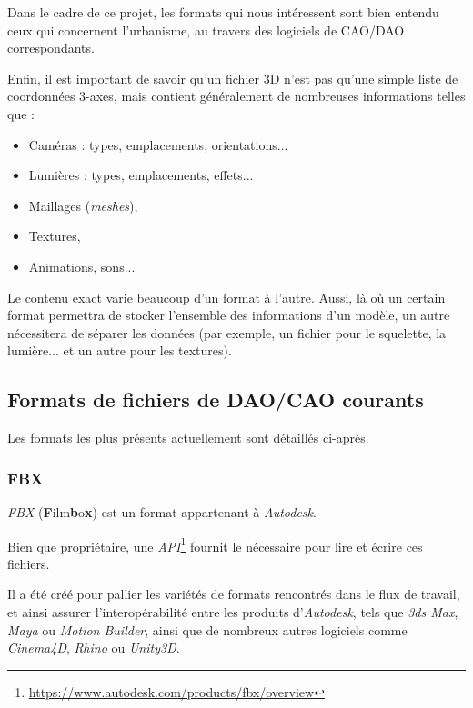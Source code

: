 Dans le cadre de ce projet, les formats qui nous intéressent sont bien entendu ceux qui concernent l'urbanisme, au travers des logiciels de CAO/DAO correspondants.

Enfin, il est important de savoir qu'un fichier 3D n'est pas qu'une simple liste de coordonnées 3-axes, mais contient généralement de nombreuses informations telles que : 
\begin{itemize}
    \item Caméras : types, emplacements, orientations...
    \item Lumières : types, emplacements, effets...
    \item Maillages (\textit{meshes}),
    \item Textures,
    \item Animations, sons...
\end{itemize}

Le contenu exact varie beaucoup d'un format à l'autre. Aussi, là où un certain format permettra de stocker l'ensemble des informations d'un modèle, un autre nécessitera de séparer les données (par exemple, un fichier pour le squelette, la lumière... et un autre pour les textures).  


\subsection{Formats de fichiers de DAO/CAO courants}

Les formats les plus présents actuellement sont détaillés ci-après.

\subsubsection{FBX}
\textit{FBX} (\textbf{F}ilm\textbf{b}o\textbf{x}) est un format appartenant à \textit{Autodesk}.

Bien que propriétaire, une \textit{API}\footnote{\url{https://www.autodesk.com/products/fbx/overview}} fournit le nécessaire pour lire et écrire ces fichiers.

Il a été créé pour pallier les variétés de formats rencontrés dans le flux de travail, et ainsi assurer l'interopérabilité entre les produits d'\textit{Autodesk}, tels que \textit{3ds Max}, \textit{Maya} ou \textit{Motion Builder}, ainsi que de nombreux autres logiciels comme \textit{Cinema4D}, \textit{Rhino} ou \textit{Unity3D}.

